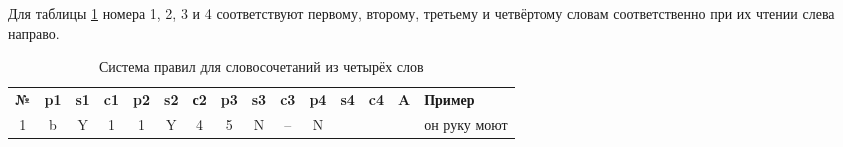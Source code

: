 \documentclass[main]{subfiles}
\begin{document}
Для таблицы \ref{tab3} номера 1, 2, 3 и 4 соответствуют первому, второму, третьему и четвёртому словам соответственно при их чтении слева направо.
\begin{longtable}[c]{|c|c|c|c|c|c|c|c|c|c|c|c|c|c|p{90px}|}
	\captionsetup{format=hang,labelsep = endash, singlelinecheck=false}
	\caption{Система правил для словосочетаний из четырёх слов}\label{tab3}\\
	\hline
	\textbf{№}&\textbf{p1} &\textbf{s1}&\textbf{c1}&\textbf{p2}&\textbf{s2}&\textbf{с2}&\textbf{p3}&\textbf{s3}&\textbf{c3}&\textbf{p4} &\textbf{s4}&\textbf{c4}&\textbf{A}&\textbf{Пример} \\ \hline
	1 &b  &Y  &1  &1  &Y  &4  &5  &N &--&N&&&&он руку моют \\ \hline
\end{longtable}
\end{document}
